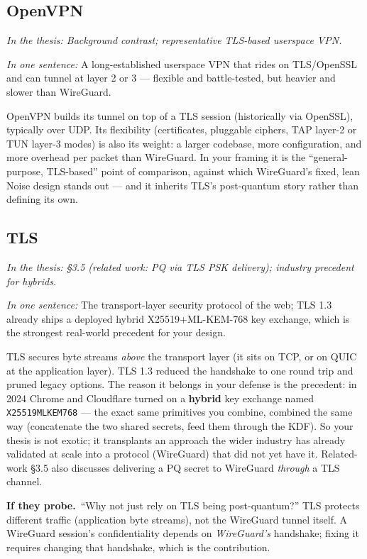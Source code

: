 \documentclass[11pt]{article}
\newcommand{\seethesis}[1]{%
  {\small\color{softgray}\textit{In the thesis: #1}}\par\vspace{3pt}}
\newcommand{\keyq}[1]{%
  \par\vspace{0.4em}%
  \noindent\colorbox{boxbg}{%
    \parbox{\dimexpr\textwidth-2\fboxsep}{%
      \small\textbf{\color{deepcyan}If they probe.}\ #1}}%
  \par\vspace{0.5em}}
\newcommand{\nutshell}[1]{\noindent\textit{In one sentence:} #1\par\vspace{4pt}}
\begin{document}
\subsection{OpenVPN}
\seethesis{Background contrast; representative TLS-based userspace VPN.}
\nutshell{A long-established userspace VPN that rides on TLS/OpenSSL and can
tunnel at layer 2 or 3 --- flexible and battle-tested, but heavier and slower
than WireGuard.}

OpenVPN builds its tunnel on top of a TLS session (historically via OpenSSL),
typically over UDP. Its flexibility (certificates, pluggable ciphers, TAP layer-2
or TUN layer-3 modes) is also its weight: a larger codebase, more configuration,
and more overhead per packet than WireGuard. In your framing it is the
``general-purpose, TLS-based'' point of comparison, against which WireGuard's
fixed, lean Noise design stands out --- and it inherits TLS's post-quantum story
rather than defining its own.

\subsection{TLS}
\seethesis{\S3.5 (related work: PQ via TLS PSK delivery); industry precedent for hybrids.}
\nutshell{The transport-layer security protocol of the web; TLS 1.3 already
ships a deployed hybrid X25519+ML-KEM-768 key exchange, which is the strongest
real-world precedent for your design.}

TLS secures byte streams \emph{above} the transport layer (it sits on TCP, or on
QUIC at the application layer). TLS 1.3 reduced the handshake to one round trip
and pruned legacy options. The reason it belongs in your defense is the
precedent: in 2024 Chrome and Cloudflare turned on a \textbf{hybrid} key
exchange named \texttt{X25519MLKEM768} --- the exact same primitives you combine,
combined the same way (concatenate the two shared secrets, feed them through the
KDF). So your thesis is not exotic; it transplants an approach the wider industry
has already validated at scale into a protocol (WireGuard) that did not yet have
it. Related-work \S3.5 also discusses delivering a PQ secret to WireGuard
\emph{through} a TLS channel.

\keyq{``Why not just rely on TLS being post-quantum?'' TLS protects different
traffic (application byte streams), not the WireGuard tunnel itself. A WireGuard
session's confidentiality depends on \emph{WireGuard's} handshake; fixing it
requires changing that handshake, which is the contribution.}
\end{document}
